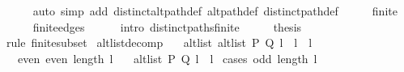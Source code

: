 \begin{isabellebody}
\ \ \ \ \isamarkupfalse%
\ {\isacharparenleft}{\kern0pt}auto\ simp\ add{\isacharcolon}{\kern0pt}\ distinct{\isacharunderscore}{\kern0pt}alt{\isacharunderscore}{\kern0pt}path{\isacharunderscore}{\kern0pt}def\ alt{\isacharunderscore}{\kern0pt}path{\isacharunderscore}{\kern0pt}def\ distinct{\isacharunderscore}{\kern0pt}path{\isacharunderscore}{\kern0pt}def{\isacharparenright}{\kern0pt}\isanewline
\ \ \isamarkupfalse%
\ \isamarkupfalse%
\ {\isachardoublequoteopen}finite\ {\isachardot}{\kern0pt}{\isachardot}{\kern0pt}{\isachardot}{\kern0pt}{\isachardoublequoteclose}\isanewline
\ \ \ \ \isamarkupfalse%
\ finite{\isacharunderscore}{\kern0pt}edges\isanewline
\ \ \ \ \isamarkupfalse%
\ {\isacharparenleft}{\kern0pt}intro\ distinct{\isacharunderscore}{\kern0pt}paths{\isacharunderscore}{\kern0pt}finite{\isacharparenright}{\kern0pt}\isanewline
\ \ \isamarkupfalse%
\ \isamarkupfalse%
\ {\isacharquery}{\kern0pt}thesis\isanewline
\ \ \ \ \isamarkupfalse%
\ {\isacharparenleft}{\kern0pt}rule\ finite{\isacharunderscore}{\kern0pt}subset{\isacharparenright}{\kern0pt}\isanewline
{}\isamarkupfalse%
%
\endisatagproof
{\isafoldproof}%
%
\isadelimproof
\isanewline
%
\endisadelimproof
%
\isadeliminvisible
\isanewline
%
\endisadeliminvisible
%
\isataginvisible
{}\isamarkupfalse%
\ alt{\isacharunderscore}{\kern0pt}list{\isacharunderscore}{\kern0pt}decomp{\isacharcolon}{\kern0pt}\isanewline
\ \ \ alt{\isacharunderscore}{\kern0pt}list{\isacharcolon}{\kern0pt}\ {\isachardoublequoteopen}alt{\isacharunderscore}{\kern0pt}list\ P\ Q\ {\isacharparenleft}{\kern0pt}l{}\ {\isacharat}{\kern0pt}\ l{}\ {\isacharat}{\kern0pt}\ l{}{\isacharparenright}{\kern0pt}{\isachardoublequoteclose}\isanewline
\ \ \ even{\isacharcolon}{\kern0pt}\ {\isachardoublequoteopen}even\ {\isacharparenleft}{\kern0pt}length\ l{}{\isacharparenright}{\kern0pt}{\isachardoublequoteclose}\isanewline
\ \ \ {\isachardoublequoteopen}alt{\isacharunderscore}{\kern0pt}list\ P\ Q\ {\isacharparenleft}{\kern0pt}l{}\ {\isacharat}{\kern0pt}\ l{}{\isacharparenright}{\kern0pt}{\isachardoublequoteclose}%
\endisataginvisible
{\isafoldinvisible}%
%
\isadeliminvisible
\isanewline
%
\endisadeliminvisible
%
\isadelimproof
%
\endisadelimproof
%
\isatagproof
{}\isamarkupfalse%
\ {\isacharparenleft}{\kern0pt}cases\ {\isachardoublequoteopen}odd\ {\isacharparenleft}{\kern0pt}length\ l{}{\isacharparenright}{\kern0pt}{\isachardoublequoteclose}{\isacharparenright}{\kern0pt}\isanewline

\end{isabellebody}
